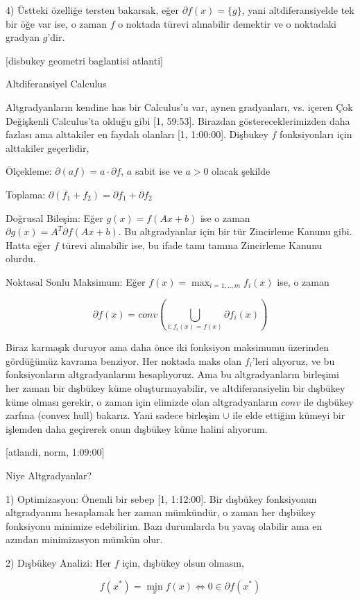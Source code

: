 \documentclass[12pt,fleqn]{article}\usepackage{../../common}
\begin{document}
4) Üstteki özelliğe tersten bakarsak, eğer $\partial f(x) = \{ g \}$, yani
altdiferansiyelde tek bir öğe var ise, o zaman $f$ o noktada türevi
alınabilir demektir ve o noktadaki gradyan $g$'dir. 

[disbukey geometri baglantisi atlanti]

Altdiferansiyel Calculus

Altgradyanların kendine has bir Calculus'u var, aynen gradyanları,
vs. içeren Çok Değişkenli Calculus'ta olduğu gibi [1, 59:53]. Birazdan
göstereceklerimizden daha fazlası ama alttakiler en faydalı olanları [1,
1:00:00]. Dişbukey $f$ fonksiyonları için alttakiler geçerlidir,

Ölçekleme: $\partial (af) = a \cdot \partial f$, $a$ sabit ise ve $a > 0$
olacak şekilde

Toplama: $\partial (f_1 + f_2) = \partial f_1 + \partial f_2$

Doğrusal Bileşim: Eğer $g(x) = f(Ax + b)$ ise o zaman
$\partial g(x) = A^T \partial f(Ax + b)$. Bu altgradyanlar için bir tür
Zincirleme Kanunu gibi. Hatta eğer $f$ türevi alınabilir ise, bu ifade tamı
tamına Zincirleme Kanunu olurdu. 

Noktasal Sonlu Maksimum: Eğer $f(x) = \max_{i=1,..,m} f_i(x)$ ise, o zaman 

$$
\partial f(x) = conv \left( 
\bigcup_{i: f_i(x)=f(x)} \partial f_i(x)
\right)
$$

Biraz karmaşık duruyor ama daha önce iki fonksiyon maksimumu üzerinden
gördüğümüz kavrama benziyor. Her noktada maks olan $f_i$'leri alıyoruz, ve
bu fonksiyonların altgradyanlarını hesaplıyoruz. Ama bu altgradyanların
birleşimi her zaman bir dışbükey küme oluşturmayabilir, ve
altdiferansiyelin bir dışbükey küme olması gerekir, o zaman için elimizde
olan altgradyanların $conv$ ile dışbükey zarfına (convex hull)
bakarız. Yani sadece birleşim $\cup$ ile elde ettiğim kümeyi bir işlemden
daha geçirerek onun dışbükey küme halini alıyorum.

[atlandi, norm, 1:09:00]

Niye Altgradyanlar? 

1) Optimizasyon: Önemli bir sebep [1, 1:12:00]. Bir dışbükey fonksiyonun
altgradyanını hesaplamak her zaman mümkündür, o zaman her dışbükey
fonksiyonu minimize edebilirim. Bazı durumlarda bu yavaş olabilir ama en
azından minimizasyon mümkün olur.

2) Dışbükey Analizi: Her $f$ için, dışbükey olsun olmasın, 

$$
f(x^*) = \min_x f(x) \iff 0 \in \partial f(x^*)
$$
\end{document}
